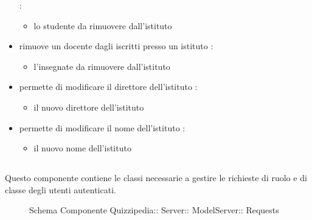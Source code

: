 \begin{itemize}
 :
\begin{itemize}
\item {}
\newline
lo studente da rimuovere dall'istituto
\end{itemize}
\item {}
\newline
rimuove un docente dagli iscritti presso un istituto
\newline
{} :
\begin{itemize}
\item {}
\newline
l'insegnate da rimuovere dall'istituto
\end{itemize}
\item {}
\newline
permette di modificare il direttore dell'istituto
\newline
{} :
\begin{itemize}
\item {}
\newline
il nuovo direttore dell'istituto
\end{itemize}
\item {}
\newline
permette di modificare il nome dell'istituto
\newline
{} :
\begin{itemize}
\item {}
\newline
il nuovo nome dell'istituto
\end{itemize}
\end{itemize}
\subsection{}
Questo componente contiene le classi necessarie a gestire le richieste di ruolo e di classe degli utenti autenticati.
\begin{figure}[H]
\centering
\noindent{}
\caption[Schema Componente Quizzipedia::Server::ModelServer::Requests]{Schema Componente Quizzipedia:: Server:: ModelServer:: Requests}
\end{figure}
